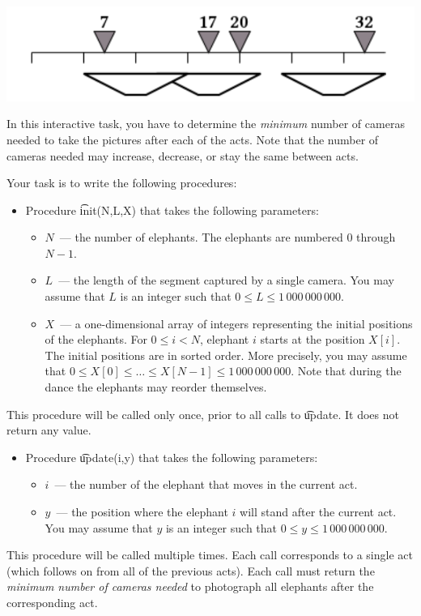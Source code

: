 \includegraphics[bb= 0 0 100 100]{elephants1.png}

In this interactive task, you have to determine the \textit{minimum} number of cameras needed to take
the pictures after each of the acts. Note that the number of cameras needed may increase, decrease, or stay the same between acts.

Your task is to write the following procedures:

\begin{itemize}
\item Procedure \t{init(N,L,X)} that takes the following parameters:

\begin{itemize}
\item $N$~--- the number of elephants. The elephants are numbered $0$ through $N-1$.
\item $L$~--- the length of the segment captured by a single camera. You may assume
that $L$ is an integer such that $0 \le L \le 1\,000\,000\,000$.
\item $X$~--- a one-dimensional array of integers representing the initial positions of the
elephants. For $0 \le i < N$, elephant $i$ starts at the position $X[i]$. The initial
positions are in sorted order. More precisely, you may assume that
$0 \le X[0] \le \dots \le X[N-1] \le 1\,000\,000\,000$. Note that during the dance the
elephants may reorder themselves.
\end{itemize}
\end{itemize}
This procedure will be called only once, prior to all calls to \t{update}. It does not return any
value.
\begin{itemize}
\item Procedure \t{update(i,y)} that takes the following parameters:
\begin{itemize}
\item $i$~--- the number of the elephant that moves in the current act.
\item $y$~--- the position where the elephant $i$ will stand after the current act. You may assume that $y$ is an integer such that $0 \le y \le 1\,000\,000\,000$.
\end{itemize}
\end{itemize}
This procedure will be called multiple times. Each call corresponds to a single act (which
follows on from all of the previous acts). Each call must return the \textit{minimum number of cameras needed} to photograph all elephants after the corresponding act.



